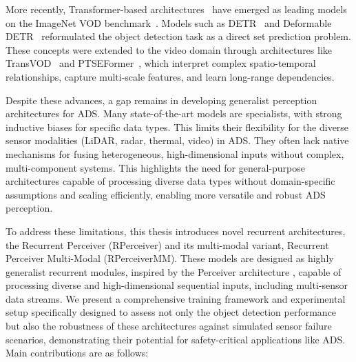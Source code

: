More recently, Transformer-based architectures~\cite{vaswaniAttentionAllYou2023} have emerged as leading models on the ImageNet VOD benchmark~\cite{russakovskyImageNetLargeScale2015}. Models such as DETR~\cite{carionEndtoEndObjectDetection2020} and Deformable DETR~\cite{zhuDeformableDETRDeformable2021} reformulated the object detection task as a direct set prediction problem. These concepts were extended to the video domain through architectures like TransVOD~\cite{zhouTransVODEndtoEndVideo2023} and PTSEFormer~\cite{wangPTSEFormerProgressiveTemporalSpatial2022}, which interpret complex spatio-temporal relationships, capture multi-scale features, and learn long-range dependencies.


Despite these advances, a gap remains in developing generalist perception architectures for ADS. Many state-of-the-art models are specialists, with strong inductive biases for specific data types. This limits their flexibility for the diverse sensor modalities (LiDAR, radar, thermal, video) in ADS. They often lack native mechanisms for fusing heterogeneous, high-dimensional inputs without complex, multi-component systems. This highlights the need for general-purpose architectures capable of processing diverse data types without domain-specific assumptions and scaling efficiently, enabling more versatile and robust ADS perception.



To address these limitations, this thesis introduces novel recurrent architectures, the Recurrent Perceiver (RPerceiver) and its multi-modal variant, Recurrent Perceiver Multi-Modal (RPerceiverMM). These models are designed as highly generalist recurrent modules, inspired by the Perceiver architecture \cite{jaeglePerceiverGeneralPerception2021}, capable of processing diverse and high-dimensional sequential inputs, including multi-sensor data streams. We present a comprehensive training framework and experimental setup specifically designed to assess not only the object detection performance but also the robustness of these architectures against simulated sensor failure scenarios, demonstrating their potential for safety-critical applications like ADS. Main contributions are as follows:

